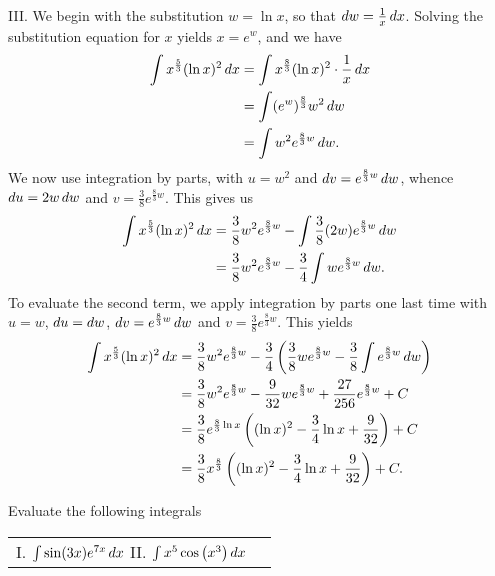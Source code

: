 \documentclass[]{ximera}
\begin{document}
\begin{freeResponse}
III. We begin with the substitution $w = \ln x$, so that $\mathop{}\!d w = \frac{1}{x} \mathop{}\!d x$. Solving the substitution equation for $x$ yields $x = e^w$, and we have
		\begin{align*}
		\int x^{\frac{5}{3}} (\ln x)^2 \mathop{}\!d x 
		&= \int x^{\frac{8}{3}} (\ln x)^2 \cdot \frac{1}{x} \mathop{}\!d x  \\
		&= \int (e^w)^{\frac{8}{3}} w^2 \mathop{}\!d w  \\
		&= \int w^2 e^{\frac{8}{3} w} \mathop{}\!d w.
		\end{align*}
	We now use integration by parts, with $u = w^2$ and $\mathop{}\!d v = e^{\frac{8}{3} w} \mathop{}\!d w$, whence $\mathop{}\!d u = 2 w \mathop{}\!d w$ and $v = \frac{3}{8} e^{\frac{8}{3} w}$. This gives us
		\begin{align*}
		\int x^{\frac{5}{3}} (\ln x)^2 \mathop{}\!d x
		&= \frac{3}{8} w^2 e^{\frac{8}{3} w} - \int \frac{3}{8} (2w) e^{\frac{8}{3} w} \mathop{}\!d w  \\
		&= \frac{3}{8} w^2 e^{\frac{8}{3} w} - \frac{3}{4} \int w e^{\frac{8}{3} w} \mathop{}\!d w.
		\end{align*}
	To evaluate the second term, we apply integration by parts one last time with $u = w$, $\mathop{}\!d u = \mathop{}\!d w$, 	$\mathop{}\!d v = e^{\frac{8}{3} w} \mathop{}\!d w$ and $v = \frac{3}{8} e^{\frac{8}{3} w}$. This yields
		\begin{align*}
		\int x^{\frac{5}{3}} (\ln x)^2 \mathop{}\!d x
		&= \frac{3}{8}w^2 e^{\frac{8}{3} w} - \frac{3}{4} \left( \frac{3}{8} w e^{\frac{8}{3} w} - \frac{3}{8} \int e^{\frac{8}{3} w} \mathop{}\!d w \right) \\
		&= \frac{3}{8} w^2 e^{\frac{8}{3} w} - \frac{9}{32} w e^{\frac{8}{3} w} + \frac{27}{256} e^{\frac{8}{3} w} + C  \\
		&= \frac{3}{8} e^{\frac{8}{3} \ln x} \left( (\ln x)^2 - \frac{3}{4} \ln x + \frac{9}{32} \right) + C  \\
		&= \frac{3}{8} x^{\frac{8}{3}} \left( (\ln x)^2 - \frac{3}{4} \ln x + \frac{9}{32} \right) + C.
		\end{align*}
\end{freeResponse}





\pagebreak

\begin{problem}

Evaluate the following integrals

\begin{center}
\begin{tabular}{ll}
I. $\int \sin(3x) e^{7x} \mathop{}\!d x$ \hspace{.5in} II. $\int x^5 \cos \left( x^3 \right) \mathop{}\!d x$
\end{tabular}
\end{center}
	
\end{problem}
\end{document}
